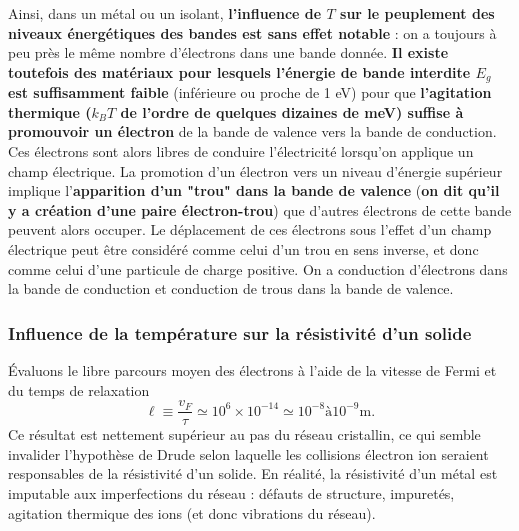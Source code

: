 \documentclass[11pt,a4paper]{report}
\begin{document}
Ainsi, dans un métal ou un isolant, \textbf{l'influence de $T$ sur le peuplement des niveaux énergétiques des bandes est sans effet notable} : on a toujours à peu près le même nombre d'électrons dans une bande donnée. \textbf{Il existe toutefois des matériaux pour lesquels l'énergie de bande interdite $E_g$ est suffisamment faible} (inférieure ou proche de 1 eV) pour que \textbf{l'agitation thermique ($k_B T$ de l'ordre de quelques dizaines de meV) suffise à promouvoir un électron} de la bande de valence vers la bande de conduction. Ces électrons sont alors libres de conduire l'électricité lorsqu'on applique un champ électrique. La promotion d'un électron vers un niveau d'énergie supérieur implique l'\textbf{apparition d'un "trou" dans la bande de valence} (\textbf{on dit qu'il y a création d'une paire électron-trou}) que d'autres électrons de cette bande peuvent alors occuper. Le déplacement de ces électrons sous l'effet d'un champ électrique peut être considéré comme celui d'un trou en sens inverse, et donc comme celui d'une particule de charge positive. On a conduction d'électrons dans la bande de conduction et conduction de trous dans la bande de valence.\\

\subsubsection{Influence de la température sur la résistivité d'un solide}

Évaluons le libre parcours moyen des électrons à l'aide de la vitesse de Fermi et du temps de relaxation
\begin{equation}
	\ell \equiv \frac{v_F}{\tau} \simeq 10^6 \times 10^{-14} \simeq 10^{-8} \text{à} 10^{-9} \text{m}.
\end{equation}
Ce résultat est nettement supérieur au pas du réseau cristallin, ce qui semble invalider l'hypothèse de Drude selon laquelle les collisions électron ion seraient responsables de la résistivité d'un solide. En réalité, la résistivité d'un métal est imputable aux imperfections du réseau : défauts de structure, impuretés, agitation thermique des ions (et donc vibrations du réseau).\\
\end{document}
